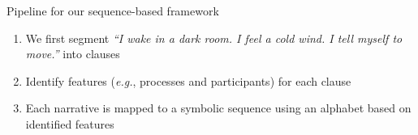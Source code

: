 \documentclass[handout,10pt]{beamer}
\begin{document}
\begin{frame}{Pipeline for our sequence-based framework}
\pause

\begin{enumerate}[<+->]
    \item We first segment \textit{“I wake in a dark room. I feel a cold wind. I tell myself to move.”} into clauses
    \item Identify features (\textit{e.g.}, processes and participants) for each clause
    \item Each narrative is mapped to a symbolic sequence using an alphabet based on identified features
\end{enumerate}

    
\end{frame}
\end{document}
